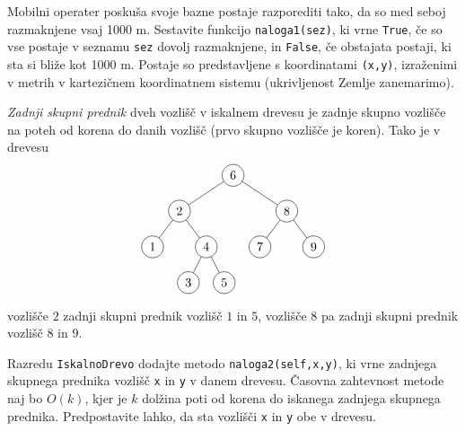 \documentclass[arhiv]{izpit}
\begin{document}

\naloga[25 točk]

Mobilni operater poskuša svoje bazne postaje razporediti tako, da so med seboj razmaknjene vsaj 1000 m.
Sestavite funkcijo \verb|naloga1(sez)|, ki vrne \verb|True|, če so vse postaje v seznamu \verb|sez| dovolj razmaknjene, in \verb|False|, če obstajata postaji, ki sta si bliže kot 1000 m.
Postaje so predstavljene s koordinatami \verb|(x,y)|, izraženimi v metrih v kartezičnem koordinatnem sistemu (ukrivljenost Zemlje zanemarimo).


\naloga[25 točk]

\emph{Zadnji skupni prednik} dveh vozlišč v iskalnem drevesu je zadnje skupno vozlišče na poteh od korena do danih vozlišč (prvo skupno vozlišče je koren).
Tako je v drevesu
\[
  \begin{tikzpicture}[level distance=1cm,
    level 1/.style={sibling distance=3cm},
    level 2/.style={sibling distance=1.5cm},
    level 3/.style={sibling distance=1cm}
    ]
    \node[circle, draw] {6}
      child {node[circle, draw] {2}
        child {node[circle, draw] {1}}
        child {node[circle, draw] {4}
          child {node[circle, draw] {3}}
          child {node[circle, draw] {5}}
        }
      }
      child {node[circle, draw] {8}
      child {node[circle, draw] {7}}
        child {node[circle, draw] {9}}
      };
  \end{tikzpicture}
\]
vozlišče $2$ zadnji skupni prednik vozlišč $1$ in $5$, vozlišče $8$ pa zadnji skupni prednik vozlišč $8$ in $9$.

Razredu \verb|IskalnoDrevo| dodajte metodo \verb|naloga2(self,x,y)|, ki vrne zadnjega skupnega prednika vozlišč \verb|x| in \verb|y| v danem drevesu.
Časovna zahtevnost metode naj bo $O(k)$, kjer je $k$ dolžina poti od korena do iskanega zadnjega skupnega prednika.
Predpostavite lahko, da sta vozlišči \verb|x| in \verb|y| obe v drevesu.
\end{document}
